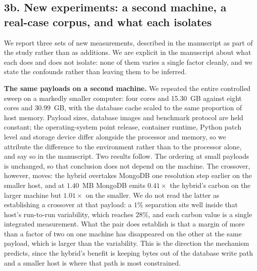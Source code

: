 \documentclass[11pt,a4paper]{article}
\begin{document}
\subsection*{3b. New experiments: a second machine, a real-case corpus, and what each isolates}

We report three sets of new measurements, described in the manuscript as part of the study rather than as
additions. We are explicit in the manuscript about what each does and does not isolate: none of them varies
a single factor cleanly, and we state the confounds rather than leaving them to be inferred.

\textbf{The same payloads on a second machine.} We repeated the entire controlled sweep on a markedly
smaller computer: four cores and 15.30~GB against eight cores and 30.99~GB, with the database cache scaled
to the same proportion of host memory. Payload sizes, database images and benchmark protocol are held
constant; the operating-system point release, container runtime, Python patch level and storage device
differ alongside the processor and memory, so we attribute the difference to the environment rather than to
the processor alone, and say so in the manuscript. Two results follow. The ordering at small payloads is unchanged,
so that conclusion does not depend on the machine. The crossover, however, moves: the hybrid overtakes
MongoDB one resolution step earlier on the smaller host, and at $1.40$~MB MongoDB emits $0.41\times$ the
hybrid's carbon on the larger machine but $1.01\times$ on the smaller. We do not read the latter as
establishing a crossover at that payload: a $1\%$ separation sits well inside that host's run-to-run
variability, which reaches $28\%$, and each carbon value is a single integrated measurement. What the pair
does establish is that a margin of more than a factor of two on one machine has disappeared on the other at
the same payload, which is larger than the variability. This is the direction the mechanism predicts, since the hybrid's benefit is keeping bytes out of the database
write path and a smaller host is where that path is most constrained.
\end{document}
